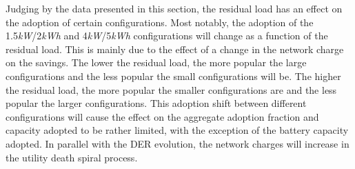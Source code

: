 Judging by the data presented in this section, the residual load has an effect on the adoption of certain configurations. Most notably, the adoption of the 1.5\textit{kW}/2\textit{kWh} and 4\textit{kW}/5\textit{kWh} configurations will change as a function of the residual load. This is mainly due to the effect of a change in the network charge on the savings. The lower the residual load, the more popular the large configurations and the less popular the small configurations will be. The higher the residual load, the more popular the smaller configurations are and the less popular the larger configurations. This adoption shift between different configurations will cause the effect on the aggregate adoption fraction and capacity adopted to be rather limited, with the exception of the battery capacity adopted. In parallel with the DER evolution, the network charges will increase in the utility death spiral process. 

